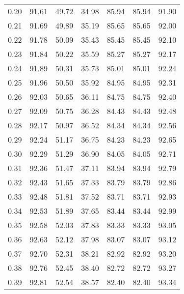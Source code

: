 \begin{tabular}{|c|c|c|c|c|c|c|}
      0.20 &     91.61 &     49.72 &      34.98 &   85.94 &      85.94 &         91.90 \\
      0.21 &     91.69 &     49.89 &      35.19 &   85.65 &      85.65 &         92.00 \\
      0.22 &     91.78 &     50.09 &      35.43 &   85.45 &      85.45 &         92.10 \\
      0.23 &     91.84 &     50.22 &      35.59 &   85.27 &      85.27 &         92.17 \\
      0.24 &     91.89 &     50.31 &      35.73 &   85.01 &      85.01 &         92.24 \\
      0.25 &     91.96 &     50.50 &      35.92 &   84.95 &      84.95 &         92.31 \\
      0.26 &     92.03 &     50.65 &      36.11 &   84.75 &      84.75 &         92.40 \\
      0.27 &     92.09 &     50.75 &      36.28 &   84.43 &      84.43 &         92.48 \\
      0.28 &     92.17 &     50.97 &      36.52 &   84.34 &      84.34 &         92.56 \\
      0.29 &     92.24 &     51.17 &      36.75 &   84.23 &      84.23 &         92.65 \\
      0.30 &     92.29 &     51.29 &      36.90 &   84.05 &      84.05 &         92.71 \\
      0.31 &     92.36 &     51.47 &      37.11 &   83.94 &      83.94 &         92.79 \\
      0.32 &     92.43 &     51.65 &      37.33 &   83.79 &      83.79 &         92.86 \\
      0.33 &     92.48 &     51.81 &      37.52 &   83.71 &      83.71 &         92.93 \\
      0.34 &     92.53 &     51.89 &      37.65 &   83.44 &      83.44 &         92.99 \\
      0.35 &     92.58 &     52.03 &      37.83 &   83.33 &      83.33 &         93.05 \\
      0.36 &     92.63 &     52.12 &      37.98 &   83.07 &      83.07 &         93.12 \\
      0.37 &     92.70 &     52.31 &      38.21 &   82.92 &      82.92 &         93.20 \\
      0.38 &     92.76 &     52.45 &      38.40 &   82.72 &      82.72 &         93.27 \\
      0.39 &     92.81 &     52.54 &      38.57 &   82.40 &      82.40 &         93.34 \\

\end{tabular}
